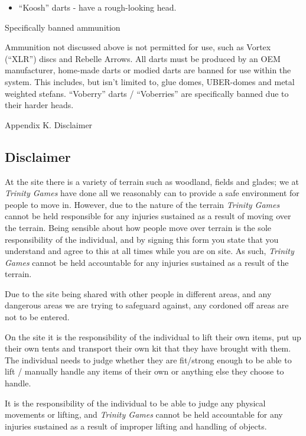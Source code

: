 \documentclass{scrbook}
\begin{document}
\begin{itemize}
\item ``Koosh'' darts - have a rough-looking head.

\end{itemize}
Specifically banned ammunition

Ammunition not discussed above is not permitted for use, such as Vortex (``XLR'') discs and Rebelle Arrows. All darts must be produced by an OEM manufacturer, home-made darts or modied darts are banned for use within the system. This includes, but isn't limited to, glue domes, UBER-domes and metal weighted stefans. ``Voberry'' darts / ``Voberries'' are specifically banned due to their harder heads.

Appendix K. Disclaimer

\subsection{Disclaimer}

At the site there is a variety of terrain such as woodland, fields and glades; we at \textit{Trinity Games} have done all we reasonably can to provide a safe environment for people to move in. However, due to the nature of the terrain \textit{Trinity Games} cannot be held responsible for any injuries sustained as a result of moving over the terrain. Being sensible about how people move over terrain is the sole responsibility of the individual, and by signing this form you state that you understand and agree to this at all times while you are on site. As such, \textit{Trinity Games} cannot be held accountable for any injuries sustained as a result of the terrain.

Due to the site being shared with other people in different areas, and any dangerous areas we are trying to safeguard against, any cordoned off areas are not to be entered.

On the site it is the responsibility of the individual to lift their own items, put up their own tents and transport their own kit that they have brought with them. The individual needs to judge whether they are fit/strong enough to be able to lift / manually handle any items of their own or anything else they choose to handle.

It is the responsibility of the individual to be able to judge any physical movements or lifting, and \textit{Trinity Games} cannot be held accountable for any injuries sustained as a result of improper lifting and handling of objects.
\end{document}
